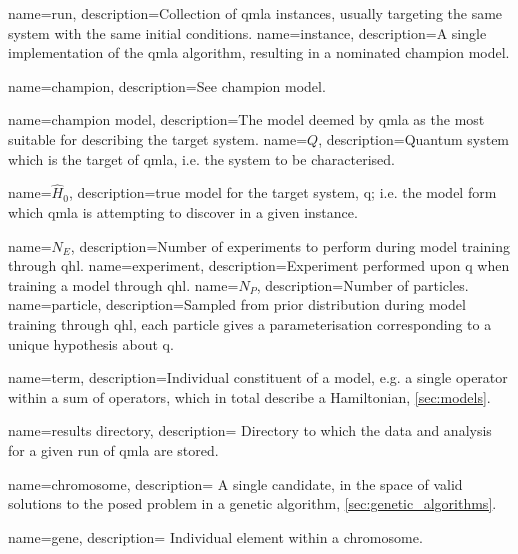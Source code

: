 {
    name=run,
    description={Collection of \acrshort{qmla} \glspl{instance}, usually targeting the same system with the same initial conditions.}
}
{
    name=instance,
    description={A single implementation of the \acrshort{qmla} algorithm, resulting in a nominated \gls{champion model}.}
}

{
    name=champion,
    description={See \gls{champion model}.}
}

{
    name=champion model,
    description={The model deemed by \acrshort{qmla} as the most suitable for describing the target system.}
}
{
    name=$Q$,
    description={Quantum system which is the target of \acrshort{qmla}, i.e. the system to be characterised.}
}

{
    name=$\hat{H}_0$,
    description={\Gls{true model} for the target system, \gls{q}; i.e. the \gls{model} form which \acrshort{qmla} is attempting to discover in a given \gls{instance}.}
}

{
    name=$N_E$,
    description={Number of \glspl{experiment} to perform during model training through \gls{qhl}.}
}
{
    name=experiment,
    description={Experiment performed upon \gls{q} when training a model through \gls{qhl}.}
}
{
    name=$N_P$,
    description={Number of \glspl{particle}}.
}
{
    name=particle,
    description={Sampled from prior distribution during model training through \gls{qhl}, each particle gives a parameterisation corresponding to a unique 
    hypothesis about \gls{q}.
    }
}

{
    name=term,
    description={Individual constituent of a model, 
    e.g. a single operator within a sum of operators, which in total describe a Hamiltonian, \cref{sec:models}.
    }
}

{
    name={results directory},
    description={
        Directory to which the data and analysis for a given \gls{run} of \acrshort{qmla} are stored.
    }
}

{
    name=chromosome,
    description={
        A single candidate, in the space of valid solutions to the posed problem in a genetic algorithm, \cref{sec:genetic_algorithms}.
    }
}

{
    name=gene,
    description={
        Individual element within a \gls{chromosome}.
    }
}


\makeglossaries
